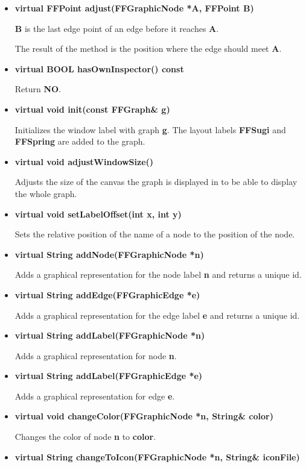 \begin{itemize}
\item{\bf virtual FFPoint adjust(FFGraphicNode *A, FFPoint B)}
  
{\bf B} is the last edge point of an edge before it reaches {\bf A}.

The result of the method is the position where the edge should meet
{\bf A}.

\item{\bf virtual BOOL hasOwnInspector() const}

Return {\bf NO}.

\item{\bf virtual void init(const FFGraph\& g)}

Initializes the window label with graph {\bf g}. The  layout labels
{\bf FFSugi} and {\bf FFSpring} are added to the graph.

\item{\bf virtual void adjustWindowSize()}

Adjusts the size of the canvas the graph is displayed in to be able
to display the whole graph.

\item{\bf virtual void setLabelOffset(int x, int y)}
  
Sets the relative position of the name of a node to the position of the
node.

\item{\bf virtual String addNode(FFGraphicNode *n)}

Adds a graphical representation for the node label {\bf n} and returns
a unique id.

\item{\bf virtual String addEdge(FFGraphicEdge *e)}

Adds a graphical representation for the edge label {\bf e} and returns
a unique id.

\item{\bf virtual String addLabel(FFGraphicNode *n)}

Adds a graphical representation for node {\bf n}.

\item{\bf virtual String addLabel(FFGraphicEdge *e)}

Adds a graphical representation for edge {\bf e}.

\item{\bf virtual void changeColor(FFGraphicNode *n, String\& color)}

Changes the color of node {\bf n} to {\bf color}.

\item{\bf virtual String changeToIcon(FFGraphicNode *n, 
        String\& iconFile)}


\end{itemize}
